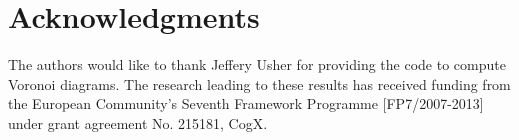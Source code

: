 \documentclass[letterpaper]{article}
\begin{document}
\section{Acknowledgments}

The authors would like to thank Jeffery Usher for providing the code to compute Voronoi diagrams. The research leading to these results has received funding from the European Community's Seventh Framework Programme [FP7/2007-2013] under grant agreement No. 215181, CogX.



\end{document}
